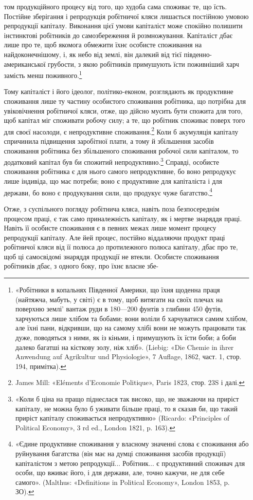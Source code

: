 том продукційного процесу від того, що худоба сама споживає
те, що їсть. Постійне зберігання і репродукція робітничої кляси
лишається постійною умовою репродукції капіталу. Виконання
цієї умови капіталіст може спокійно полишити інстинктові
робітників до самозбереження й розмножування. Капіталіст
дбає лише про те, щоб якомога обмежити їхнє особисте споживання
на найдоконечнішому, і, як небо від землі, він далекий від
тієї південно-американської грубости, з якою робітників примушують
їсти поживніший харч замість менш поживного.\footnote{
«Робітники в копальнях Південної Америки, що їхня щоденна
праця (найтяжча, мабуть, у світі) є в тому, щоб витягати на своїх плечах
на поверхню землі' вантаж руди в 180—200 фунтів з глибини 450 футів,
харчуються лише хлібом та бобами; вони воліли б харчуватися
самим хлібом, але їхні пани, відкривши, що на самому хлібі вони не
можуть працювати так дуже, поводяться з ними, як із кіньми, і примушують
їх їсти боби; а боби далеко багатші на кісткову золу, ніж хліб».
(Liebig: «Die Chemie in ihrer Anwendung auf Agrikultur und Physiologie»,
7 Auflage, 1862, част. 1, стор. 194, примітка).
}

Тому капіталіст і його ідеолог, політико-економ, розглядають
як продуктивне споживання лише ту частину особистого споживання
робітника, що потрібна для увіковічнення робітничої
кляси, отже, що дійсно мусить бути спожита для того, щоб капітал
міг споживати робочу силу; а те, що робітник споживає поверх
того для своєї насолоди, є непродуктивне споживання.\footnote{
James Mill: «Eléments d’Economie Politique», Paris 1823, стор. 23S
і далі.
}
Коли б акумуляція капіталу спричинила підвищення заробітної
плати, а тому й збільшення засобів споживання робітника без
збільшеного споживання робочої сили капіталом, то додатковий
капітал був би спожитий непродуктивно.\footnote{
«Коли б ціна на пращо піднеслася так високо, що, не зважаючи
на приріст капіталу, не можна було б уживати більше праці, то я сказав
би, що такий приріст капіталу споживається непродуктивно» (Ricardo:
«Principles of Political Economy», 3 rd ed., London 1821, p. 163).
} Справді, особисте
споживання робітника є для нього самого непродуктивне, бо воно
репродукує лише індивіда, що має потреби; воно є продуктивне
для капіталіста і для держави, бо воно є продукування сили,
що продукує чуже багатство.\footnote{
«Єдине продуктивне споживання у власному значенні слова є
споживання або руйнування багатства (він має на думці споживання
засобів продукції) капіталістом з метою репродукції... Робітник... є
продуктивний споживач для особи, що вживає його, і для держави, але,
точно кажучи, не для себе самого». (Malthus: «Definitions in Political
Economy», London 1853, p. ЗО).
}

Отже, з суспільного погляду робітнича кляса, навіть поза
безпосереднім процесом праці, є так само приналежність капіталу,
як і мертве знаряддя праці. Навіть її особисте споживання
є в певних межах лише момент процесу репродукції капіталу.
Але йей процес, постійно віддаляючи продукт праці робітничої
кляси від її полюса до протилежного полюса капіталу, дбає
про те, щоб ці самосвідомі знаряддя продукції не втекли. Особисте
споживання робітників дбає, з одного боку, про їхнє власне збе-